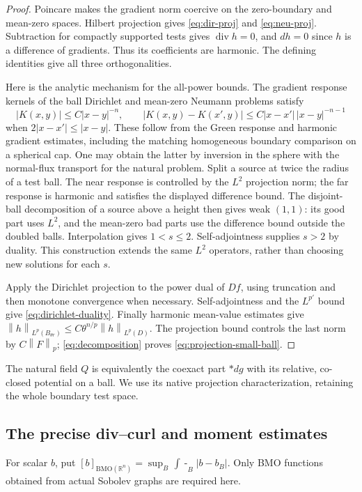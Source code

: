\documentclass[11pt,a4paper]{article}
\numberwithin{equation}{section}
\theoremstyle{definition}
\theoremstyle{remark}
\newcommand{\R}{\mathbb R}
\newcommand{\BMO}{\mathrm{BMO}}
\newcommand{\diver}{\operatorname{div}}
\newcommand{\fint}{\mathop{\int\!\!\!\!-}}
\newcommand{\norm}[1]{\left\lVert#1\right\rVert}
\begin{document}
\begin{proof}
Poincare makes the gradient norm coercive on the zero-boundary and
mean-zero spaces. Hilbert projection gives \eqref{eq:dir-proj} and
\eqref{eq:neu-proj}. Subtraction for compactly supported tests gives
$\diver h=0$, and $dh=0$ since $h$ is a difference of gradients.
Thus its coefficients are harmonic. The defining identities give all
three orthogonalities.

Here is the analytic mechanism for the all-power bounds. The gradient
response kernels of the ball Dirichlet and mean-zero Neumann problems
satisfy
\[
 |K(x,y)|\leq C|x-y|^{-n},\qquad
 |K(x,y)-K(x',y)|\leq C|x-x'|\,|x-y|^{-n-1}
\]
when $2|x-x'|\leq|x-y|$. These follow from the Green response and
harmonic gradient estimates, including the matching homogeneous boundary
comparison on a spherical cap. One may obtain the latter by inversion
in the sphere with the normal-flux transport for the natural problem.
Split a source at twice the radius of a test ball. The near response is
controlled by the $L^2$ projection norm; the far response is harmonic
and satisfies the displayed difference bound. The disjoint-ball
decomposition of a source above a height then gives weak $(1,1)$:
its good part uses $L^2$, and the mean-zero bad parts use the difference
bound outside the doubled balls. Interpolation gives $1<s\leq2$.
Self-adjointness supplies $s>2$ by duality. This construction extends
the same $L^2$ operators, rather than choosing new solutions for each $s$.

Apply the Dirichlet projection to the power dual of $Df$, using
truncation and then monotone convergence when necessary. Self-adjointness
and the $L^{p'}$ bound give \eqref{eq:dirichlet-duality}.
Finally harmonic mean-value estimates give
$\norm h_{L^p(B_{\theta r})}\leq C\theta^{n/p}\norm h_{L^p(D)}$.
The projection bound controls the last norm by $C\norm F_p$;
\eqref{eq:decomposition} proves \eqref{eq:projection-small-ball}.
\end{proof}

The natural field $Q$ is equivalently the coexact part $*dg$ with its
relative, co-closed potential on a ball. We use its native projection
characterization, retaining the whole boundary test space.

\subsection{The precise div--curl and moment estimates}\label{sec:compensation}
For scalar $b$, put
$[b]_{\BMO(\R^n)}=\sup_B\fint_B|b-b_B|$. Only BMO functions
obtained from actual Sobolev graphs are required here.
\end{document}
